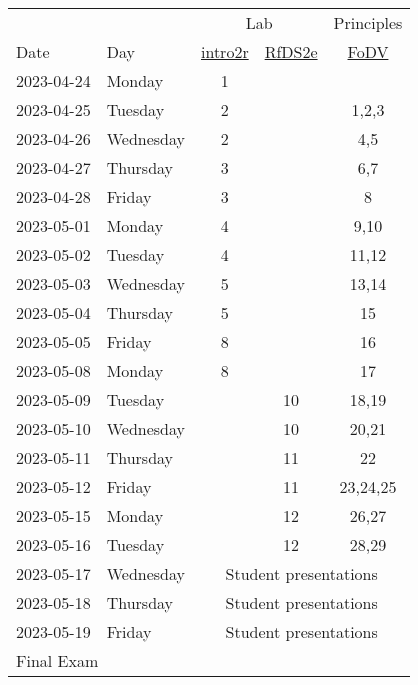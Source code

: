 \documentclass[12pt]{article}
\begin{document}
\begin{description}
\begin{tabular}{llccc}
&&\multicolumn{2}{c}{\hrulefill Lab\hrulefill} & Principles \\
Date & Day & \href{https://intro2r.com/}{intro2r}
      & \href{https://r4ds.hadley.nz/}{RfDS2e}
       & \href{https://clauswilke.com/dataviz/index.html}{FoDV} \\\hline
2023-04-24     &     Monday     & 1 &  &    \\
 2023-04-25     &        Tuesday  & 2 & & 1,2,3      \\
 2023-04-26    &       Wednesday  & 2 & & 4,5      \\
 2023-04-27    &        Thursday     & 3 & & 6,7    \\
 2023-04-28    &          Friday      & 3 & &  8    \\\hline
 2023-05-01    &          Monday   & 4&   & 9,10   \\
 2023-05-02    &         Tuesday    & 4 & & 11,12    \\
 2023-05-03    &       Wednesday & 5 &  &  13,14    \\
 2023-05-04    &        Thursday   & 5 &   &  15   \\
 2023-05-05    &          Friday      &  8&  & 16    \\\hline
 2023-05-08    &          Monday   & 8 &  & 17   \\
 2023-05-09    &         Tuesday    &  & 10 & 18,19    \\
 2023-05-10    &       Wednesday &   &  10  & 20,21    \\
 2023-05-11   &         Thursday&  &  11&  22    \\
 2023-05-12   &           Friday   &   & 11  &  23,24,25  \\\hline
 2023-05-15   &           Monday&   & 12   &   26,27    \\
 2023-05-16   &          Tuesday&   &   12  &   28,29   \\
 2023-05-17   &        Wednesday&   \multicolumn{3}{c}{Student presentations}       \\
 2023-05-18   &         Thursday & \multicolumn{3}{c}{Student presentations}       \\
 2023-05-19   &           Friday   &  \multicolumn{3}{c}{Student presentations}     \\\hline
 \multicolumn{4}{l}{Final Exam}
\end{tabular}

\end{description}
\end{document}
